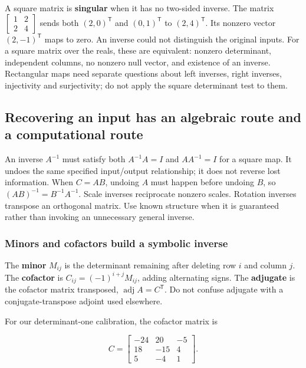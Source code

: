 A square matrix is \textbf{singular} when it has no two-sided inverse. The matrix \(\begin{bmatrix}1&2\\2&4\end{bmatrix}\) sends both \((2,0)^{\mathsf T}\) and \((0,1)^{\mathsf T}\) to \((2,4)^{\mathsf T}\). Its nonzero vector \((2,-1)^{\mathsf T}\) maps to zero. An inverse could not distinguish the original inputs. For a square matrix over the reals, these are equivalent: nonzero determinant, independent columns, no nonzero null vector, and existence of an inverse. Rectangular maps need separate questions about left inverses, right inverses, injectivity and surjectivity; do not apply the square determinant test to them.

\subsection{Recovering an input has an algebraic route and a computational route}\label{01-foundations-i-ch018-recovering-an-input-has-an-algebraic-route-and-a-computational-route}

An inverse \(A^{-1}\) must satisfy both \(A^{-1}A=I\) and \(AA^{-1}=I\) for a square map. It undoes the same specified input/output relationship; it does not reverse lost information. When \(C=AB\), undoing \(A\) must happen before undoing \(B\), so \((AB)^{-1}=B^{-1}A^{-1}\). Scale inverses reciprocate nonzero scales. Rotation inverses transpose an orthogonal matrix. Use known structure when it is guaranteed rather than invoking an unnecessary general inverse.

\subsubsection{Minors and cofactors build a symbolic inverse}\label{01-foundations-i-ch018-minors-and-cofactors-build-a-symbolic-inverse}

The \textbf{minor} \(M_{ij}\) is the determinant remaining after deleting row \(i\) and column \(j\). The \textbf{cofactor} is \(C_{ij}=(-1)^{i+j}M_{ij}\), adding alternating signs. The \textbf{adjugate} is the cofactor matrix transposed, \(\operatorname{adj}A=C^{\mathsf T}\). Do not confuse adjugate with a conjugate-transpose adjoint used elsewhere.

For our determinant-one calibration, the cofactor matrix is

\[
C=\begin{bmatrix}-24&20&-5\\18&-15&4\\5&-4&1\end{bmatrix}.
\]

